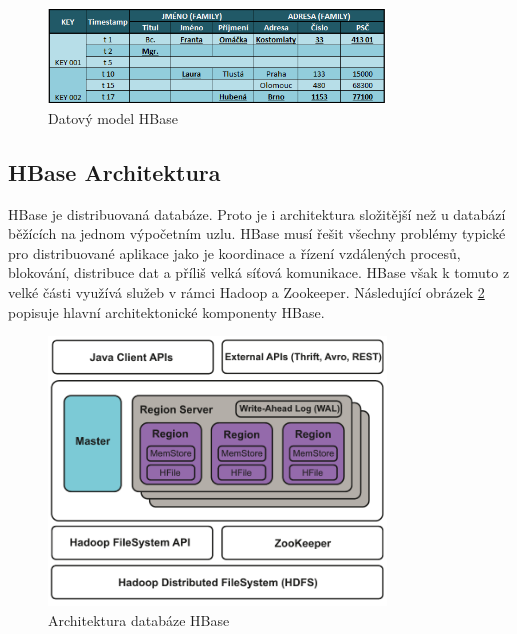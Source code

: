 \documentclass[thesis=M,czech]{FITthesis}[2012/06/26]
\begin{document}
\begin{figure}[h]\centering
	\includegraphics[width=0.8\textwidth, angle=0]{files/hbase}
	\caption[Datový model HBase]{Datový model HBase}\label{fig:hbase}
\end{figure}

\subsection{HBase Architektura}
HBase je distribuovaná databáze. Proto je i architektura složitější než u databází běžících na jednom výpočetním uzlu. HBase musí řešit všechny problémy typické pro distribuované aplikace jako je koordinace a řízení vzdálených procesů, blokování, distribuce dat a příliš velká síťová komunikace. HBase však k tomuto z velké části využívá služeb v rámci Hadoop a Zookeeper. Následující obrázek \ref{fig:hbasearch} popisuje hlavní architektonické komponenty HBase.
\begin{figure}[h]\centering
	\includegraphics[width=0.8\textwidth, angle=0]{files/hbase-architecture}
	\caption[Architektura databáze HBase]{Architektura databáze HBase}\label{fig:hbasearch}
\end{figure}
\end{document}

